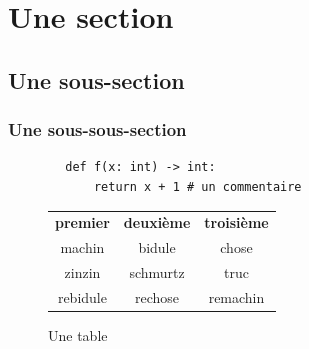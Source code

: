 \documentclass{nsibook}
\begin{document}
\section{Une section}
\subsection{Une sous-section}
\subsubsection{Une sous-sous-section}
\lipsum[5]
\begin{pyc}
    \begin{verbatim}
        def f(x: int) -> int:
            return x + 1 # un commentaire
    \end{verbatim}
\end{pyc}
\lipsum[5]
\begin{figure}
    \begin{center}
        \begin{tabular}{ccc}
            \rowcolor{UGLiOrange!75}
            \color{white}\textbf{premier} & \color{white}\textbf{deuxième} & \color{white}\textbf{troisième} \\
            machin                        & bidule                         & chose                           \\
            zinzin                        & schmurtz                       & truc\\
            rebidule                        & rechose                       & remachin\\
            
        \end{tabular}
    \end{center}
    \caption{Une table}
\end{figure}
\end{document}
